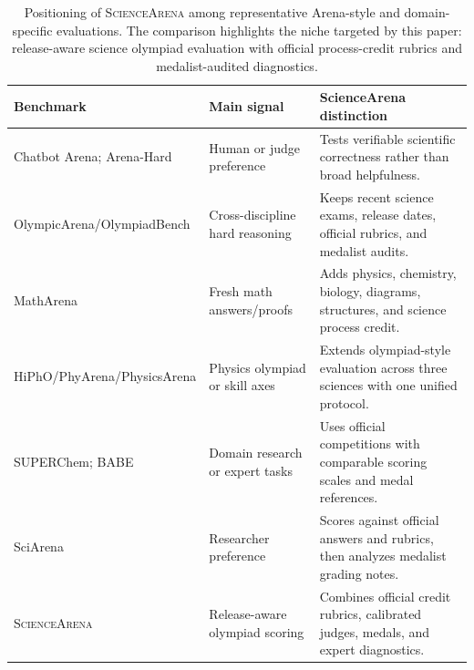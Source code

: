 \documentclass[11pt]{article}
\begin{document}
\begin{table}[t]
\centering
\scriptsize
\setlength{\tabcolsep}{5pt}
\renewcommand{\arraystretch}{0.95}
\begin{tabularx}{\textwidth}{p{} p{} Y}
\toprule
\textbf{Benchmark} & \textbf{Main signal} & \textbf{ScienceArena distinction} \\
\midrule
Chatbot Arena; Arena-Hard
& Human or judge preference
& Tests verifiable scientific correctness rather than broad helpfulness. \\
\addlinespace[0.12em]
OlympicArena/OlympiadBench
& Cross-discipline hard reasoning
& Keeps recent science exams, release dates, official rubrics, and medalist audits. \\
\addlinespace[0.12em]
MathArena
& Fresh math answers/proofs
& Adds physics, chemistry, biology, diagrams, structures, and science process credit. \\
\addlinespace[0.12em]
HiPhO/PhyArena/PhysicsArena
& Physics olympiad or skill axes
& Extends olympiad-style evaluation across three sciences with one unified protocol. \\
\addlinespace[0.12em]
SUPERChem; BABE
& Domain research or expert tasks
& Uses official competitions with comparable scoring scales and medal references. \\
\addlinespace[0.12em]
SciArena
& Researcher preference
& Scores against official answers and rubrics, then analyzes medalist grading notes. \\
\midrule
\textsc{ScienceArena}
& Release-aware olympiad scoring
& Combines official credit rubrics, calibrated judges, medals, and expert diagnostics. \\
\bottomrule
\end{tabularx}
\vspace{-0.1cm}
\caption{Positioning of \textsc{ScienceArena} among representative Arena-style and domain-specific evaluations. The comparison highlights the niche targeted by this paper: release-aware science olympiad evaluation with official process-credit rubrics and medalist-audited diagnostics.}
\label{tab:arena-positioning}
\vspace{-0.4cm}
\end{table}
\end{document}
